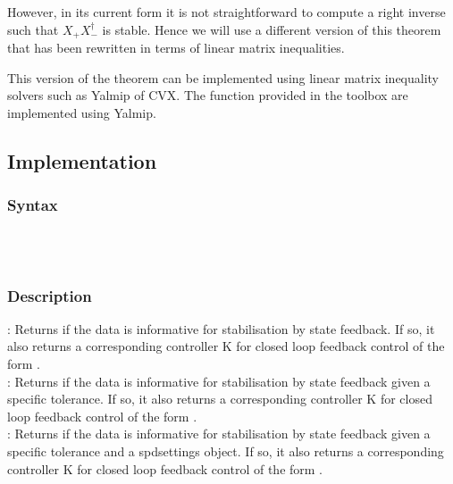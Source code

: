However, in its current form it is not straightforward to compute a right inverse such that $X_+ X_-^\dagger$ is stable. Hence we will use a different version of this theorem that has been rewritten in terms of linear matrix inequalities.


This version of the theorem can be implemented using linear matrix inequality solvers such as Yalmip of CVX. The function provided in the toolbox are implemented using Yalmip.

\subsection{Implementation}
\subsubsection*{Syntax}
 \\
 \\

\subsubsection*{Description}
: Returns if the data is informative for stabilisation by state feedback. If so, it also returns a corresponding controller K for closed loop feedback control of the form .\\
: Returns if the data is informative for stabilisation by state feedback given a specific tolerance. If so, it also returns a corresponding controller K for closed loop feedback control of the form .\\
: Returns if the data is informative for stabilisation by state feedback given a specific tolerance and a spdsettings object. If so, it also returns a corresponding controller K for closed loop feedback control of the form .

